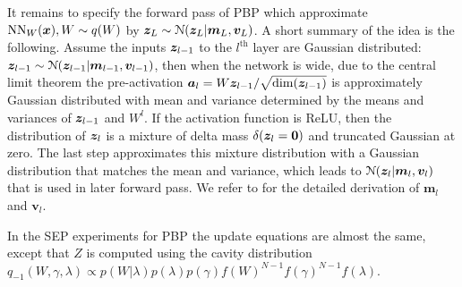 %
It remains to specify the forward pass of PBP which approximate $\text{NN}_W(\bm{x}), W \sim q(W)$ by $\bm{z}_L \sim \mathcal{N}(\bm{z}_L | \bm{m}_{L}, \bm{v}_{L})$. A short summary of the idea is the following. Assume the inputs $\bm{z}_{l-1}$ to the $l^{\text{th}}$ layer are Gaussian distributed: $\bm{z}_{l-1} \sim \mathcal{N}(\bm{z}_{l-1} | \bm{m}_{l-1}, \bm{v}_{l-1})$, then when the network is wide, due to the central limit theorem the pre-activation $\bm{a}_l = W \bm{z}_{l-1} / \sqrt{\text{dim}(\bm{z}_{l-1})}$ is approximately Gaussian distributed with mean and variance determined by the means and variances of $\bm{z}_{l-1}$ and $W^l$. If the activation function is ReLU, then the distribution of $\bm{z}_l$ is a mixture of delta mass $\delta(\bm{z}_l = \bm{0})$ and truncated Gaussian at zero. The last step approximates this mixture distribution with a Gaussian distribution that matches the mean and variance, which leads to $\mathcal{N}(\bm{z}_l | \bm{m}_l, \bm{v}_l)$ that is used in later forward pass. We refer to \cite{hernandez-lobato:pbp2015} for the detailed derivation of $\bm{m}_l$ and $\bm{v}_l$. 

In the SEP experiments for PBP the update equations are almost the same, except that $Z$ is computed using the cavity distribution $q_{-1}(W, \gamma, \lambda) \propto p(W|\lambda) p(\lambda) p(\gamma) f(W)^{N-1} f(\gamma)^{N-1} f(\lambda)$.
